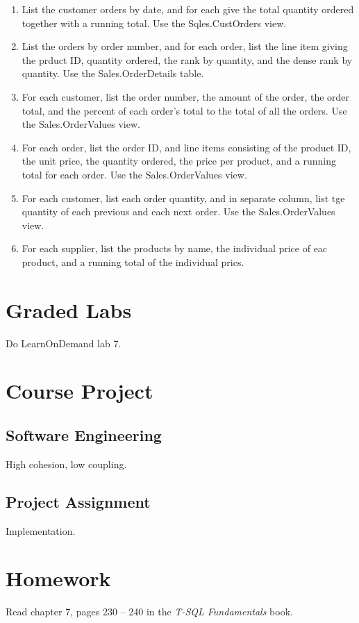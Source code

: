 \documentclass{article}
\begin{document}
    \begin{enumerate}
        \item List the customer orders by date, and for each give the total quantity ordered together with a running total. Use the Sqles.CustOrders view.
        \item List the orders by order number, and for each order, list the line item giving the prduct ID, quantity ordered, the rank by quantity, and the dense rank by quantity. Use the Sales.OrderDetails table.
        \item For each customer, list the order number, the amount of the order, the order total, and the percent of each order's total to the total of all the orders. Use the Sales.OrderValues view.
        \item For each order, list the order ID, and line items consisting of the product ID, the unit price, the quantity ordered, the price per product, and a running total for each order. Use the Sales.OrderValues view.
        \item For each customer, list each order quantity, and in separate column, list tge quantity of each previous and each next order. Use the Sales.OrderValues view. 
        \item For each supplier, list the products by name, the individual price of eac product, and a running total of the individual prics.
    \end{enumerate}

    \section{Graded Labs}

    Do LearnOnDemand lab 7.

    \section{Course Project}


        \subsection{Software Engineering}

        High cohesion, low coupling.

        \subsection{Project Assignment}

        Implementation.

    \section{Homework}



        Read chapter 7, pages 230  -- 240  in the \textit{T-SQL Fundamentals} book.
        
\end{document}
